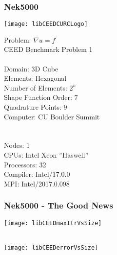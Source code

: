 \documentclass{beamer}
\begin{document}
\begin{frame}
\begin{center}
\frametitle{Nek5000}

\texttt{[image: libCEEDCURCLogo]}

\begin{flushleft}

\begin{multicols}{2}

Problem: $\nabla u = f$\\

\hspace{2mm} CEED Benchmark Problem 1\\

~\\

Domain: 3D Cube\\

Elements: Hexagonal\\

Number of Elements: $2^n$\\

Shape Function Order: $7$\\

Quadrature Points: $9$\\

Computer: CU Boulder Summit\\

~\\

~\\

Nodes: 1\\

CPUs: Intel Xeon ''Haswell''\\

Processors: 32\\

Compiler: Intel/17.0.0\\

MPI: Intel/2017.0.098

\end{multicols}

\end{flushleft}

\end{center}
\end{frame}


\begin{frame}
\begin{center}
\frametitle{Nek5000 - The Good News}

\begin{multicols}{2}

\texttt{[image: libCEEDmaxItrVsSize]}

~\\

\texttt{[image: libCEEDerrorVsSize]}

\end{multicols}

\end{center}
\end{frame}
\end{document}
